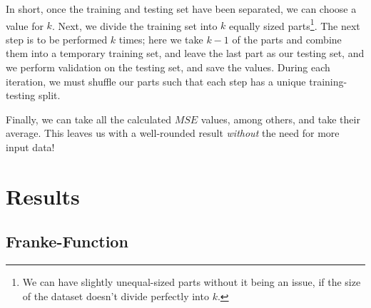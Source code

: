 \documentclass[a4paper,10pt,english]{article}
\begin{document}
In short, once the training and testing set have been separated, we can choose a value for $k$.  Next, we divide the training set into $k$ equally sized parts\footnote{We can have slightly unequal-sized parts without it being an issue, if the size of the dataset doesn't divide perfectly into $k$.}.  The next step is to be performed $k$ times; here we take $k-1$ of the parts and combine them into a temporary training set, and leave the last part as our testing set, and we perform validation on the testing set, and save the values.  During each iteration, we must shuffle our parts such that each step has a unique training-testing split.

Finally, we can take all the calculated $MSE$ values, among others, and take their average.  This leaves us with a well-rounded result \textit{without} the need for more input data!



\section{Results}
\label{sec:results}

\subsection{Franke-Function}

\end{document}
